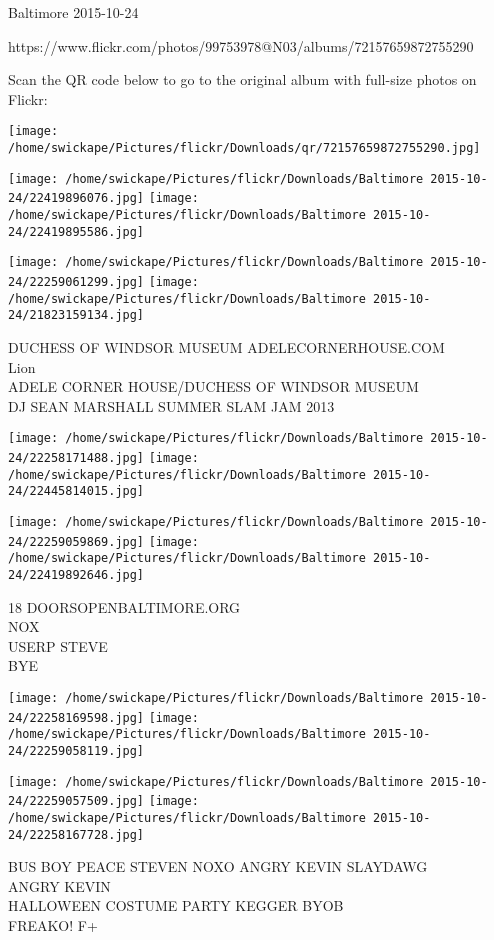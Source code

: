 \documentclass[10pt,letterpaper]{article}
\begin{document}
Baltimore 2015-10-24

https://www.flickr.com/photos/99753978@N03/albums/72157659872755290

Scan the QR code below to go to the original album with full-size photos on Flickr:

\texttt{[image: /home/swickape/Pictures/flickr/Downloads/qr/72157659872755290.jpg]}
\pagebreak

\texttt{[image: /home/swickape/Pictures/flickr/Downloads/Baltimore 2015-10-24/22419896076.jpg]}
\texttt{[image: /home/swickape/Pictures/flickr/Downloads/Baltimore 2015-10-24/22419895586.jpg]}

\texttt{[image: /home/swickape/Pictures/flickr/Downloads/Baltimore 2015-10-24/22259061299.jpg]}
\texttt{[image: /home/swickape/Pictures/flickr/Downloads/Baltimore 2015-10-24/21823159134.jpg]}

DUCHESS OF WINDSOR MUSEUM ADELECORNERHOUSE.COM\\
Lion\\
ADELE CORNER HOUSE/DUCHESS OF WINDSOR MUSEUM\\
DJ SEAN MARSHALL SUMMER SLAM JAM 2013
\pagebreak

\texttt{[image: /home/swickape/Pictures/flickr/Downloads/Baltimore 2015-10-24/22258171488.jpg]}
\texttt{[image: /home/swickape/Pictures/flickr/Downloads/Baltimore 2015-10-24/22445814015.jpg]}

\texttt{[image: /home/swickape/Pictures/flickr/Downloads/Baltimore 2015-10-24/22259059869.jpg]}
\texttt{[image: /home/swickape/Pictures/flickr/Downloads/Baltimore 2015-10-24/22419892646.jpg]}

18 DOORSOPENBALTIMORE.ORG\\
NOX\\
USERP STEVE\\
BYE
\pagebreak

\texttt{[image: /home/swickape/Pictures/flickr/Downloads/Baltimore 2015-10-24/22258169598.jpg]}
\texttt{[image: /home/swickape/Pictures/flickr/Downloads/Baltimore 2015-10-24/22259058119.jpg]}

\texttt{[image: /home/swickape/Pictures/flickr/Downloads/Baltimore 2015-10-24/22259057509.jpg]}
\texttt{[image: /home/swickape/Pictures/flickr/Downloads/Baltimore 2015-10-24/22258167728.jpg]}

BUS BOY PEACE STEVEN NOXO ANGRY KEVIN SLAYDAWG\\
ANGRY KEVIN\\
HALLOWEEN COSTUME PARTY KEGGER BYOB\\
FREAKO!  F+
\pagebreak
\end{document}

